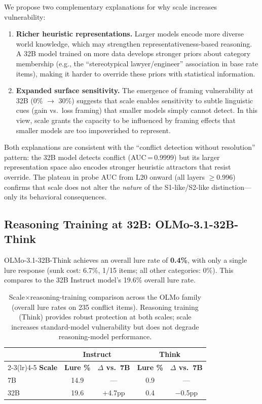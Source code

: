 \documentclass{article}
\newcommand{\sone}{S1-like}
\newcommand{\stwo}{S2-like}
\begin{document}
We propose two complementary explanations for why scale increases
vulnerability:
\begin{enumerate}[leftmargin=*,itemsep=2pt]
  \item \textbf{Richer heuristic representations.}  Larger models
  encode more diverse world knowledge, which may strengthen
  representativeness-based reasoning.  A 32B model trained on more
  data develops stronger priors about category membership (e.g., the
  ``stereotypical lawyer/engineer'' association in base rate items),
  making it harder to override these priors with statistical information.

  \item \textbf{Expanded surface sensitivity.}  The emergence of
  framing vulnerability at 32B (0\% $\to$ 30\%) suggests that scale
  enables sensitivity to subtle linguistic cues (gain vs.\ loss
  framing) that smaller models simply cannot detect.  In this view,
  scale grants the capacity to be influenced by framing effects that
  smaller models are too impoverished to represent.
\end{enumerate}

\noindent Both explanations are consistent with the
``conflict detection without resolution'' pattern: the 32B model
detects conflict (AUC\,=\,0.9999) but its larger representation space
also encodes stronger heuristic attractors that resist override.
The plateau in probe AUC from L20 onward (all layers $\geq$0.996)
confirms that scale does not alter the \emph{nature} of the
\sone{}/\stwo{} distinction---only its behavioral consequences.

\subsection{Reasoning Training at 32B: OLMo-3.1-32B-Think}

OLMo-3.1-32B-Think achieves an overall lure rate of \textbf{0.4\%},
with only a single lure response (sunk cost: 6.7\%, 1/15 items;
all other categories: 0\%).  This compares to the 32B Instruct
model's 19.6\% overall lure rate.

\begin{table}[ht]
\centering
\caption{Scale$\times$reasoning-training comparison across the OLMo
  family (overall lure rates on 235 conflict items).  Reasoning
  training (Think) provides robust protection at both scales; scale
  increases standard-model vulnerability but does not degrade
  reasoning-model performance.}
\label{tab:scale_reasoning}
\vspace{4pt}
\small
\begin{tabular}{lcccc}
\toprule
& \multicolumn{2}{c}{\textbf{Instruct}} & \multicolumn{2}{c}{\textbf{Think}} \\
\cmidrule(lr){2-3}\cmidrule(lr){4-5}
\textbf{Scale} & \textbf{Lure \%} & \textbf{$\Delta$ vs.\ 7B} & \textbf{Lure \%} & \textbf{$\Delta$ vs.\ 7B} \\
\midrule
7B  & 14.9 & ---      & 0.9 & --- \\
32B & 19.6 & $+$4.7pp & 0.4 & $-$0.5pp \\
\bottomrule
\end{tabular}
\end{table}
\end{document}
